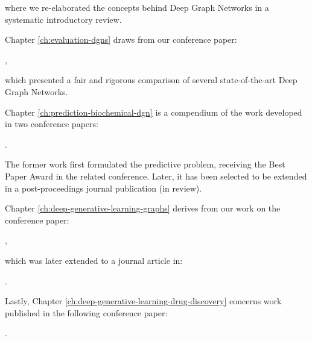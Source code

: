 \noindent where we re-elaborated the concepts behind Deep Graph Networks in a systematic introductory review.

\noindent Chapter \ref{ch:evaluation-dgns} draws from our conference paper:

\vspace{1em}
,
\vspace{1em}

\noindent which presented a fair and rigorous comparison of several state-of-the-art Deep Graph Networks.

\noindent Chapter \ref{ch:prediction-biochemical-dgn} is a compendium of the work developed in two conference papers:

\vspace{1em}

.
\vspace{1em}

\noindent The former work first formulated the predictive problem, receiving the Best Paper Award in the related conference. Later, it has been selected to be extended in a post-proceedings journal publication (in review).

\noindent Chapter \ref{ch:deep-generative-learning-graphs} derives from our work on the conference paper:

\vspace{1em}
,
\vspace{1em}

\noindent which was later extended to a journal article in:

\vspace{1em}
.
\vspace{1em}

\noindent Lastly, Chapter \ref{ch:deep-generative-learning-drug-discovery} concerns work published in the following conference paper:

\vspace{1em}
.
\vspace{1em}